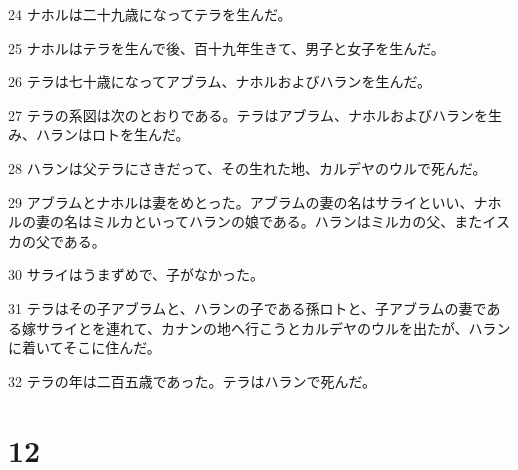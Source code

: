 \par 24 ナホルは二十九歳になってテラを生んだ。
\par 25 ナホルはテラを生んで後、百十九年生きて、男子と女子を生んだ。
\par 26 テラは七十歳になってアブラム、ナホルおよびハランを生んだ。
\par 27 テラの系図は次のとおりである。テラはアブラム、ナホルおよびハランを生み、ハランはロトを生んだ。
\par 28 ハランは父テラにさきだって、その生れた地、カルデヤのウルで死んだ。
\par 29 アブラムとナホルは妻をめとった。アブラムの妻の名はサライといい、ナホルの妻の名はミルカといってハランの娘である。ハランはミルカの父、またイスカの父である。
\par 30 サライはうまずめで、子がなかった。
\par 31 テラはその子アブラムと、ハランの子である孫ロトと、子アブラムの妻である嫁サライとを連れて、カナンの地へ行こうとカルデヤのウルを出たが、ハランに着いてそこに住んだ。
\par 32 テラの年は二百五歳であった。テラはハランで死んだ。

\chapter{12}

